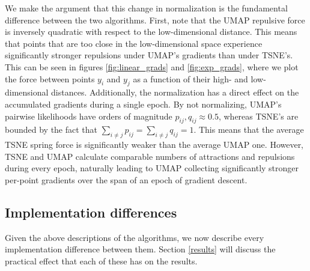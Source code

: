 \documentclass[sigconf, nonacm]{acmart}
\begin{document}
We make the argument that this change in normalization is the fundamental difference between the two algorithms. First, note that the UMAP repulsive force is
inversely quadratic with respect to the low-dimensional distance. This means that points that are too close in the low-dimensional space experience
significantly stronger repulsions under UMAP's gradients than under TSNE's. This can be seen in figures \ref{fig:linear_grads} and \ref{fig:exp_grads}, where we
plot the force between points $y_i$ and $y_j$ as a function of their high- and low-dimensional distances.
Additionally, the normalization has a direct effect on the accumulated gradients during a single epoch.
By not normalizing, UMAP's pairwise likelihoods have orders of magnitude $p_{ij}, q_{ij} \approx 0.5$, whereas TSNE's are bounded by the fact that $\sum_{i \neq j}
p_{ij} = \sum_{i \neq j} q_{ij} = 1$.
This means that the average TSNE spring force is significantly weaker than the average UMAP one.
However, TSNE and UMAP calculate comparable numbers of attractions and repulsions during every epoch, naturally leading to UMAP collecting significantly
stronger per-point gradients over the span of an epoch of gradient descent.


\subsection{Implementation differences} \label{implementation_diffs}
Given the above descriptions of the algorithms, we now describe every implementation difference between them. Section \ref{results} will discuss the
practical effect that each of these has on the results.
\end{document}
